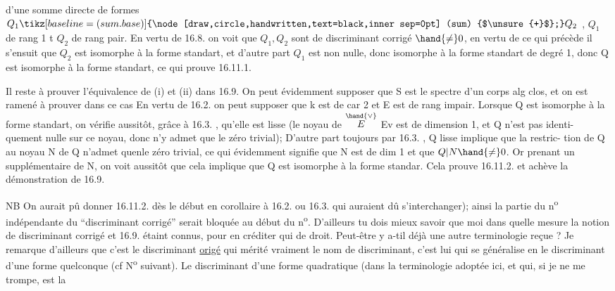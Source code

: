 
d'une somme directe de formes $Q_1 \tikz[baseline=(sum.base)]{\node[draw,circle,handwritten,text=black,inner sep=0pt] (sum) {$\unsure{+}$};} Q_2$ , $Q_1$ de rang 1 t $Q_2$ de rang pair.
En vertu de 16.8. on voit que $Q_1,Q_2$ sont de discriminant corrigé
$\hand{\neq} 0$, en vertu de ce qui précède il s'ensuit que $Q_2$ est isomorphe à la
forme standart, et d'autre part $Q_1$ est non nulle, donc isomorphe à la
forme standart de degré 1, donc Q est isomorphe à la forme standart, ce
qui prouve 16.11.1.

Il reste à prouver l'équivalence de (i) et (ii) dans 16.9. On peut
évidemment supposer que S est le spectre d'un corps alg clos, et on est 
ramené à prouver dans ce cas 
En vertu de 16.2. on peut supposer que k est de car 2 et E est de rang
impair. 
 Lorsque Q est isomorphe à la forme
standart,  on vérifie aussitôt, grâce à 16.3. , qu'elle
est lisse (le noyau de $\overset{\hand{\vee}}{E}$ \hand{$\longrightarrow$}Ev est de dimension 1, et Q n'est pas identi-%
quement nulle sur ce noyau, donc n'y admet que le zéro trivial); 
D'autre part  toujours par 16.3. , Q lisse  implique que  la restric-%
tion de Q au noyau N de Q n'admet quenle zéro trivial, ce qui évidemment
signifie  que N est de dim 1 et que $Q|N \hand{\neq} 0$. Or prenant un supplémentaire
de N, on voit aussitôt que cela implique que Q est isomorphe à la forme
standar\hand{/}. Cela prouve 16.11.2. et achève la démonstration de 16.9.

NB On aurait pû donner 16.11.2. dès le début en corollaire à
16.2. ou 16.3. \hand{(} qui auraient dû s'interchanger); ainsi la partie du n\textsuperscript{o}
indépendante du ``discriminant corrigé'' serait bloquée au début du n\textsuperscript{o}.
D'ailleurs tu dois mieux savoir que moi dans quelle mesure la notion
de discriminant corrigé et 16.9. étaint connus, pour en créditer qui de
droit. Peut-être y a-t\unsure{-}il déjà une autre terminologie reçue ? Je remarque
d'ailleurs que c'est le discriminant \uline{origé} qui mérité vraiment le nom
de discriminant, c'est lui qui se généralise en le discriminant d'une
forme quelconque (cf N\textsuperscript{o} suivant). Le discriminant d'une forme quadratique
(dans la terminologie adoptée ici, et qui, si je ne me trompe, est la

